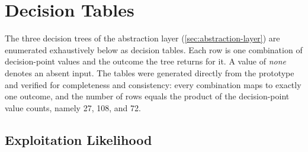\section{Decision Tables}
\label{sec:decision-tables}

The three decision trees of the abstraction layer (\cref{sec:abstraction-layer}) are enumerated exhaustively below as decision tables. Each row is one combination of decision-point values and the outcome the tree returns for it. A value of \emph{none} denotes an absent input. The tables were generated directly from the prototype and verified for completeness and consistency: every combination maps to exactly one outcome, and the number of rows equals the product of the decision-point value counts, namely 27, 108, and 72.

\subsection{Exploitation Likelihood}
